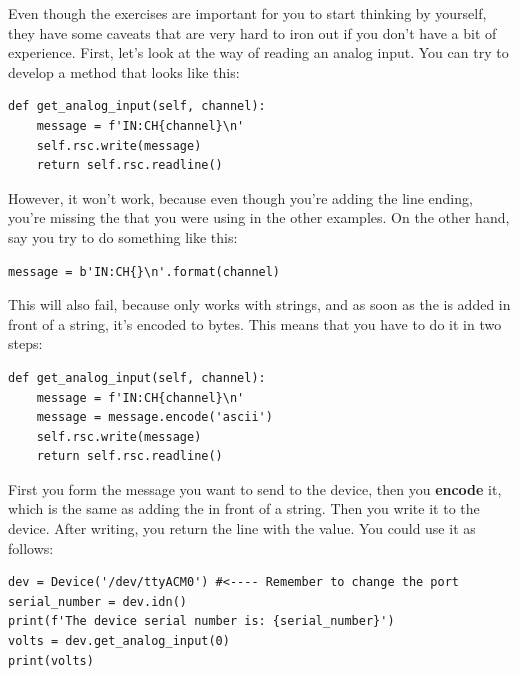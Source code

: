 

Even though the exercises are important for you to start thinking by yourself, they have some caveats that are very hard to iron out if you don't have a bit of experience. First, let's look at the way of reading an analog input. You can try to develop a method that looks like this:

\begin{verbatim}
def get_analog_input(self, channel):
    message = f'IN:CH{channel}\n'
    self.rsc.write(message)
    return self.rsc.readline()
\end{verbatim}

However, it won't work, because even though you're adding the line ending, you're missing the  that you were using in the other examples. On the other hand, say you try to do something like this:

\begin{verbatim}
message = b'IN:CH{}\n'.format(channel)
\end{verbatim}

This will also fail, because  only works with strings, and as soon as the  is added in front of a string, it's encoded to bytes. This means that you have to do it in two steps:

\begin{verbatim}
def get_analog_input(self, channel):
    message = f'IN:CH{channel}\n'
    message = message.encode('ascii')
    self.rsc.write(message)
    return self.rsc.readline()
\end{verbatim}

First you form the message you want to send to the device, then you \textbf{encode} it, which is the same as adding the  in front of a string. Then you write it to the device. After writing, you return the line with the value. You could use it as follows:

\begin{verbatim}
dev = Device('/dev/ttyACM0') #<---- Remember to change the port
serial_number = dev.idn()
print(f'The device serial number is: {serial_number}')
volts = dev.get_analog_input(0)
print(volts)
\end{verbatim}

